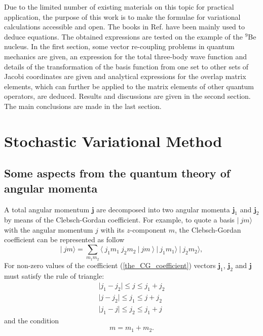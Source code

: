 \documentclass[12pt,a4paper,twoside]{article}
\begin{document}
Due to the limited number of existing materials on this topic for practical application, the purpose of this work is to make the formulae for variational calculations accessible and open. The books in Ref. \cite{suzuki1998stochastic, varshalovich1988quantum, kukulin1990dynamic} have been mainly used to deduce equations. The obtained expressions are tested on the example of the $^9$Be nucleus. In the first section, some vector re-coupling problems in quantum mechanics are given, an expression for the total three-body wave function and details of the transformation of the basis function from one set to other sets of Jacobi coordinates are given and analytical expressions for the overlap matrix elements, which can further be applied to the matrix elements of other quantum operators, are deduced. Results and discussions are given in the second section. The main conclusions are made in the last section.

\section{Stochastic Variational Method}

\subsection{Some aspects from the quantum theory of angular momenta}
A total angular momentum $\mathbf{j}$ are decomposed into two angular momenta $\mathbf{j}_1$ and $\mathbf{j}_2$ by means of the Clebsch-Gordan coefficient. For example, to quote a basis $\vert ~ jm \rangle $ with the angular momentum $ j$ with its $z$-component $m$, the Clebsch-Gordan coefficient can be represented as follow
\begin{equation}
\label{the_CG_coefficient}
\vert ~ jm \rangle =\sum_{m_1 m_2} \langle ~ j_1 m_1~j_2 m_2~ \vert ~j m~  \rangle ~ \vert ~j_1 m_1 \rangle~ \vert ~j_2 m_2 \rangle,
\end{equation}
For non-zero values of the coefficient (\ref{the_CG_coefficient}) vectors $\mathbf{j}_1$, $\mathbf{j}_2$ and $\mathbf{j}$ must satisfy the rule of triangle:
\begin{align*}
\vert j_1 - j_2 \vert \leq j \leq j_1 + j_2 \\
\vert j - j_2 \vert \leq j_1 \leq j + j_2 \\ 
\vert j_1 - j \vert \leq j_2 \leq j_1 + j 
\end{align*}
and the condition
\begin{equation*}
m=m_1+m_2.
\end{equation*}
\end{document}
